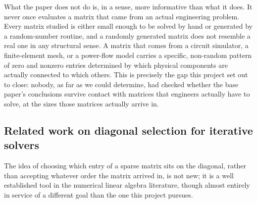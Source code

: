 \documentclass[11pt,a4paper]{article}
\begin{document}
What the paper does not do is, in a sense, more informative than what it does. It never
once evaluates a matrix that came from an actual engineering problem. Every matrix
studied is either small enough to be solved by hand or generated by a random-number
routine, and a randomly generated matrix does not resemble a real one in any structural
sense. A matrix that comes from a circuit simulator, a finite-element mesh, or a
power-flow model carries a specific, non-random pattern of zero and nonzero entries
determined by which physical components are actually connected to which others. This is
precisely the gap this project set out to close: nobody, as far as we could determine, had
checked whether the base paper's conclusions survive contact with matrices that engineers
actually have to solve, at the sizes those matrices actually arrive in.

\subsection{Related work on diagonal selection for iterative solvers}
\label{sec:motivation-related}

The idea of choosing which entry of a sparse matrix sits on the diagonal, rather than
accepting whatever order the matrix arrived in, is not new; it is a well established tool
in the numerical linear algebra literature, though almost entirely in service of a
different goal than the one this project pursues.
\end{document}
